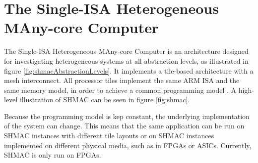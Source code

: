 



\section{The Single-ISA Heterogeneous MAny-core Computer}
\label{sec:shmac}

The Single-ISA Heterogeneous MAny-core Computer is an architecture designed for investigating heterogeneous
systems at all abstraction levels, as illustrated in figure \ref{fig:shmacAbstractionLevels}.
It implements a tile-based architecture with a mesh interconnect. All processor tiles implement the same
ARM ISA and the same memory model, in order to achieve a common programming model \cite{shmac-plan}.
A high-level illustration of SHMAC can be seen in figure \ref{fig:shmac}.

Because the programming model is kep constant, the underlying implementation of the system can change.
This means that the same application can be run on SHMAC instances with different tile layouts or on
SHMAC instances implemented on different physical media, such as in FPGAs or ASICs. Currently, SHMAC
is only run on FPGAs.

